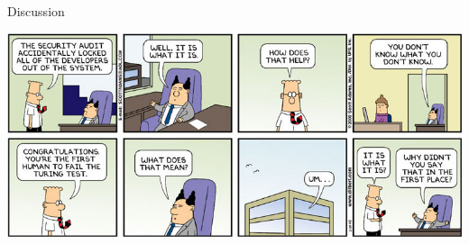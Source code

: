 
\begin{frame}{Discussion}

  \begin{center}
    \includegraphics[width=\textwidth]{figures/dilbert-turing-test}
  \end{center}

\end{frame}

\note{
}


